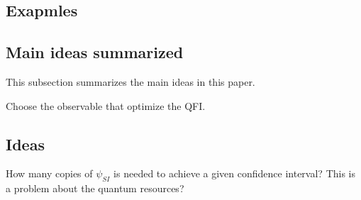 \documentclass[../../note.tex]{subfiles}
\begin{document}
\subsection{Exapmles}
\begin{example}
 
\end{example}

\begin{example}
 
\end{example}

\subsection{Main ideas summarized}
This subsection summarizes the main ideas in this paper.

Choose the observable that optimize the QFI.


\subsection{Ideas}
How many copies of $\psi_{SI}$ is needed to achieve a given confidence interval? This is a problem about the quantum resources?





\end{document}
